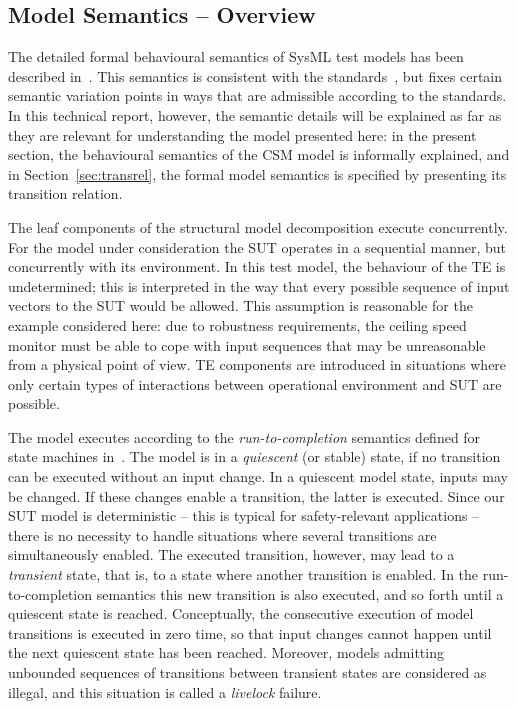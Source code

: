 \subsection{Model Semantics -- Overview} 

The detailed formal behavioural semantics of SysML test models has been described 
in~\cite[pp.~88]{d341}. This semantics is consistent with the
standards~\cite{uml_2_4,SysML12}, but fixes certain semantic variation points in
 ways that are admissible according to the standards.
In this technical report, however, the semantic details will be explained as far as they are relevant for understanding the model presented here: in the present section, the behavioural   semantics of the CSM model is 
informally explained, and in Section~\ref{sec:transrel}, the formal model semantics is specified by presenting its transition relation. 

The leaf components of the structural model decomposition execute concurrently. For the model under consideration the SUT operates in a sequential manner, but concurrently with its environment. In this test model, the  behaviour of the TE is undetermined; this is interpreted in the way that every possible sequence of input vectors to the SUT would be allowed.  This assumption is reasonable for the example considered here: due to robustness requirements, the ceiling speed monitor must be able to cope with input sequences that may be unreasonable from a physical point of view. TE components are  introduced in situations where only certain types of interactions between operational environment and SUT are possible.  

The model executes according to the {\it run-to-completion} semantics defined 
for state machines in~\cite{uml_2_4}. The model is in a {\it quiescent} (or stable) state, if 
no transition can be executed without an input change. In a quiescent model state, inputs may be changed. If these changes enable a transition, the latter is executed. Since our SUT model is deterministic -- this is typical for safety-relevant applications -- there is no necessity to handle   situations where several transitions are simultaneously enabled. The executed transition, however, may lead to a {\it transient} state, that is, to a state where another transition is enabled. In the run-to-completion semantics this new transition is also executed, and so forth until a quiescent state is reached. Conceptually, the consecutive execution of model transitions is executed in zero time, so that input changes cannot happen until the next quiescent state has been reached. Moreover, models admitting unbounded sequences of transitions between transient states are considered as illegal, and this situation is called a {\it livelock} failure.




